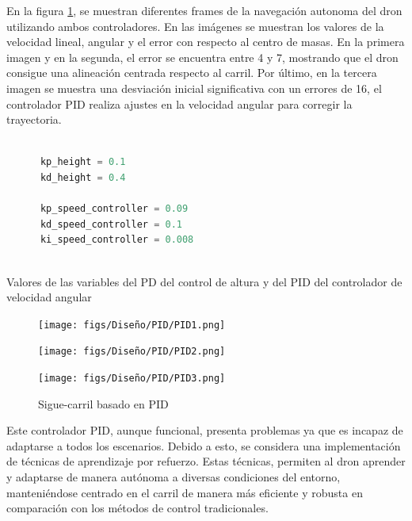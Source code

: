 En la figura \ref{sigue-carril}, se muestran diferentes frames de la navegación autonoma 
del dron utilizando ambos controladores. En las imágenes
se muestran los valores de la velocidad lineal, angular y el error con respecto al centro de masas. En la primera imagen y en la segunda, el error se encuentra
entre 4 y 7, mostrando que el dron consigue una alineación centrada respecto al carril. Por último, en la tercera imagen 
se muestra una desviación inicial significativa con un errores de 16, el controlador
PID realiza ajustes en la velocidad angular para corregir la trayectoria. 
  \begin{code}[h]
    \begin{lstlisting}[language=Python]

      kp_height = 0.1
      kd_height = 0.4

      kp_speed_controller = 0.09
      kd_speed_controller = 0.1
      ki_speed_controller = 0.008
     
    \end{lstlisting}
    \caption[Valores de las variables del PD del control de altura y del PID del controlador de velocidad angular]{Valores de las variables del PD del control de altura y del PID del controlador de velocidad angular}
    \label{cod:ValoresPID}
    \end{code} 

    \begin{figure}[H]
      \centering
    
      \begin{minipage}[t]{0.3\textwidth}
          \centering
          \texttt{[image: figs/Diseño/PID/PID1.png]}
          \caption*{}
      \end{minipage}
      \hfill
      \begin{minipage}[t]{0.3\textwidth}
          \centering
          \texttt{[image: figs/Diseño/PID/PID2.png]}
          \caption*{}
      \end{minipage}
      \hfill
      \begin{minipage}[t]{0.3\textwidth}
          \centering
          \texttt{[image: figs/Diseño/PID/PID3.png]}
          \caption*{}
      \end{minipage}
      
      \caption{Sigue-carril basado en PID}
      \label{sigue-carril}
    \end{figure}

Este controlador PID, aunque funcional, presenta problemas ya que es incapaz de adaptarse a todos los escenarios. Debido a esto, se considera una implementación de técnicas de aprendizaje por refuerzo. Estas técnicas, 
permiten al dron aprender y adaptarse de manera autónoma a diversas condiciones del entorno, manteniéndose centrado en el carril de manera más eficiente y robusta en comparación 
con los métodos de control tradicionales.

